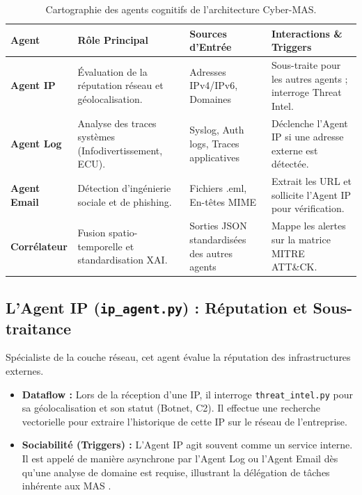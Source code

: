 \documentclass[a4paper, 12pt]{report}
\begin{document}
\begin{table}[htbp]
\centering
\caption[Cartographie des agents cognitifs de l'architecture Cyber-MAS]{Cartographie des agents cognitifs de l'architecture Cyber-MAS.}
\label{tab:cartographie_agents}
\vspace{0.2cm}
\begin{tabular}{|l|>{\raggedright\arraybackslash}p{4cm}|>{\raggedright\arraybackslash}p{3.5cm}|>{\raggedright\arraybackslash}p{4.5cm}|}
\hline
\textbf{Agent} & \textbf{Rôle Principal} & \textbf{Sources d'Entrée} & \textbf{Interactions \& Triggers} \\ \hline
\textbf{Agent IP} & Évaluation de la réputation réseau et géolocalisation. & Adresses IPv4/IPv6, Domaines & Sous-traite pour les autres agents ; interroge Threat Intel. \\ \hline
\textbf{Agent Log} & Analyse des traces systèmes (Infodivertissement, ECU). & Syslog, Auth logs, Traces applicatives & Déclenche l'Agent IP si une adresse externe est détectée. \\ \hline
\textbf{Agent Email} & Détection d'ingénierie sociale et de phishing. & Fichiers .eml, En-têtes MIME & Extrait les URL et sollicite l'Agent IP pour vérification. \\ \hline
\textbf{Corrélateur} & Fusion spatio-temporelle et standardisation XAI. & Sorties JSON standardisées des autres agents & Mappe les alertes sur la matrice MITRE ATT\&CK. \\ \hline
\end{tabular}
\end{table}

\subsection{L'Agent IP (\texttt{ip\_agent.py}) : Réputation et Sous-traitance}
Spécialiste de la couche réseau, cet agent évalue la réputation des infrastructures externes.
\begin{itemize}
    \item \textbf{Dataflow :} Lors de la réception d'une IP, il interroge \texttt{threat\_intel.py} pour sa géolocalisation et son statut (Botnet, C2). Il effectue une recherche vectorielle pour extraire l'historique de cette IP sur le réseau de l'entreprise.
    \item \textbf{Sociabilité (Triggers) :} L'Agent IP agit souvent comme un service interne. Il est appelé de manière asynchrone par l'Agent Log ou l'Agent Email dès qu'une analyse de domaine est requise, illustrant la délégation de tâches inhérente aux MAS \cite{kotkar_mas}.
\end{itemize}
\end{document}
